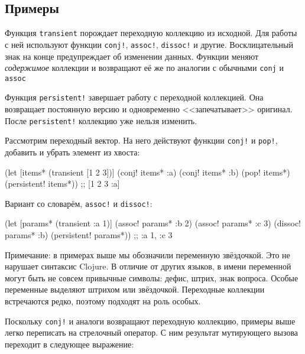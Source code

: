 \subsection{Примеры}

Функция \verb|transient| порождает переходную коллекцию из исходной. Для работы
с ней используют функции \verb|conj!|, \verb|assoc!|, \verb|dissoc!| и
другие. Восклицательный знак на конце предупреждает об изменении данных. Функции
меняют \emph{содержимое} коллекции и возвращают её же по аналогии с обычными
\verb|conj| и \verb|assoc|


Функция \verb|persistent!| завершает работу с переходной коллекцией. Она
возвращает постоянную версию и одновременно <<запечатывает>> оригинал. После
\verb|persistent!| коллекцию уже нельзя изменить.

Рассмотрим переходный вектор. На него действуют функции \verb|conj!| и
\verb|pop!|, добавить и убрать элемент из хвоста:


\begin{english}
  \begin{clojure}
(let [items* (transient [1 2 3])]
  (conj! items* :a)
  (conj! items* :b)
  (pop! items*)
  (persistent! items*))
;; [1 2 3 :a]
  \end{clojure}
\end{english}


\noindent
Вариант со словарём, \verb|assoc!| и \verb|dissoc!|:

\begin{english}
  \begin{clojure}
(let [params* (transient {:a 1})]
  (assoc! params* :b 2)
  (assoc! params* :c 3)
  (dissoc! params* :b)
  (persistent! params*))
;; {:a 1, :c 3}
  \end{clojure}
\end{english}

Примечание: в примерах выше мы обозначили переменную звёздочкой. Это не нарушает
синтаксис Clojure. В отличие от других языков, в имени переменной могут быть не
совсем привычные символы: дефис, штрих, знак вопроса. Особые переменные выделяют
штрихом или звёздочкой. Переходные коллекции встречаются редко, поэтому подходят
на роль особых.

Поскольку \verb|conj!| и аналоги возвращают переходную коллекцию, примеры выше
легко переписать на стрелочный оператор. С ним результат мутирующего вызова
переходит в следующее выражение:

